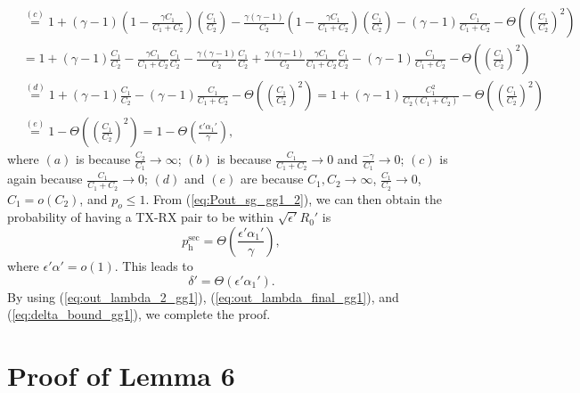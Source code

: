 \documentclass[journal,draftclsnofoot,onecolumn,12pt,twoside]{IEEEtran}
\begin{document}
\begin{equation}
\begin{aligned}
&\stackrel{(c)}{=}1+(\gamma-1)\left(1-\frac{\gamma C_1}{C_1+C_2}\right)\left(\frac{C_1}{C_2}\right)-\frac{\gamma(\gamma-1)}{C_2}\left(1-\frac{\gamma C_1}{C_1+C_2}\right)\left(\frac{C_1}{C_2}\right)-(\gamma-1)\frac{C_1}{C_1+C_2}-\Theta\left(\left(\frac{C_1}{C_2}\right)^2\right)\\
&=1+(\gamma-1)\frac{C_1}{C_2}-\frac{\gamma C_1}{C_1+C_2}\frac{C_1}{C_2}-\frac{\gamma(\gamma-1)}{C_2}\frac{C_1}{C_2}+\frac{\gamma(\gamma-1)}{C_2}\frac{\gamma C_1}{C_1+C_2}\frac{C_1}{C_2}-(\gamma-1)\frac{C_1}{C_1+C_2}-\Theta\left(\left(\frac{C_1}{C_2}\right)^2\right)\\
&\stackrel{(d)}{=}1+(\gamma-1)\frac{C_1}{C_2}-(\gamma-1)\frac{C_1}{C_1+C_2}-\Theta\left(\left(\frac{C_1}{C_2}\right)^2\right)=1+(\gamma-1)\frac{C_1^2}{C_2(C_1+C_2)}-\Theta\left(\left(\frac{C_1}{C_2}\right)^2\right)\\
&\stackrel{(e)}{=}1-\Theta\left(\left(\frac{C_1}{C_2}\right)^2\right)=1-\Theta\left(\frac{\epsilon'\alpha_1'}{\gamma}\right),
\end{aligned}
\end{equation} 
where $(a)$ is because $\frac{C_2}{C_1}\to\infty$; $(b)$ is because $\frac{C_1}{C_1+C_2}\to 0$ and $\frac{-\gamma}{C_1}\to 0$; $(c)$ is again because $\frac{C_1}{C_1+C_2}\to 0$; $(d)$ and $(e)$ are because $C_1,C_2\to\infty$, $\frac{C_1}{C_2}\to 0$, $C_1=o(C_2)$, and $p_o\leq 1$. From (\ref{eq:Pout_sg_gg1_2}), we can then obtain the probability of having a TX-RX pair to be within $\sqrt{\epsilon'}R_0'$ is
\begin{equation}\label{eq:Phit_2_gg1}
p_{\text{h}}^{\text{sec}}=\Theta\left(\frac{\epsilon'\alpha_1'}{\gamma}\right),
\end{equation}
where $\epsilon'\alpha'=o(1)$. This leads to 
\begin{equation}\label{eq:delta_bound_gg1}
\delta'=\Theta\left(\epsilon'\alpha_1'\right).
\end{equation}
By using (\ref{eq:out_lambda_2_gg1}), (\ref{eq:out_lambda_final_gg1}), and (\ref{eq:delta_bound_gg1}), we complete the proof.

\section{Proof of Lemma 6}

\label{App:ProofLemm4}
\end{document}
